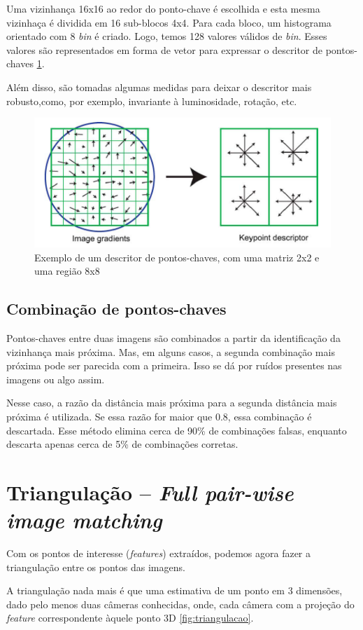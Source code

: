 Uma vizinhança 16x16 ao redor do ponto-chave é escolhida e esta mesma vizinhaça é dividida em 16 sub-blocos 4x4. Para cada bloco, um histograma orientado com 8 \emph{bin} é criado. Logo, temos 128 valores válidos de \emph{bin}. Esses valores são representados em forma de vetor para expressar o descritor de pontos-chaves \ref{fig:descritorKeypoint}. 

Além disso, são tomadas algumas medidas para deixar o descritor mais robusto,como, por exemplo, invariante à luminosidade, rotação, etc.

\begin{figure} [!h]
	\centering
	\includegraphics[width=0.45\linewidth]{figs/descritorKeypoint.png}
	\caption{%
	Exemplo de um descritor de pontos-chaves, com uma matriz 2x2 e uma região 8x8
	}\label{fig:descritorKeypoint}
\end{figure}

\subsection*{Combinação de pontos-chaves}

Pontos-chaves entre duas imagens são combinados a partir da identificação da vizinhança mais próxima. Mas, em alguns casos, a segunda combinação mais próxima pode ser parecida com a primeira. Isso se dá por ruídos presentes nas imagens ou algo assim. 

Nesse caso, a razão da distância mais próxima para a segunda distância mais próxima é utilizada. Se essa razão for maior que 0.8, essa combinação é descartada.
Esse método elimina cerca de 90\% de combinações falsas, enquanto descarta apenas cerca de 5\% de combinações corretas.

\section*{Triangulação -- \emph{Full pair-wise image matching}}

Com os pontos de interesse (\emph{features}) extraídos, podemos agora fazer a triangulação entre os pontos das imagens.

A triangulação nada mais é que uma estimativa de um ponto em 3 dimensões, dado pelo menos duas câmeras conhecidas, onde, cada câmera com a projeção do \emph{feature} correspondente àquele ponto 3D \ref{fig:triangulacao}.

